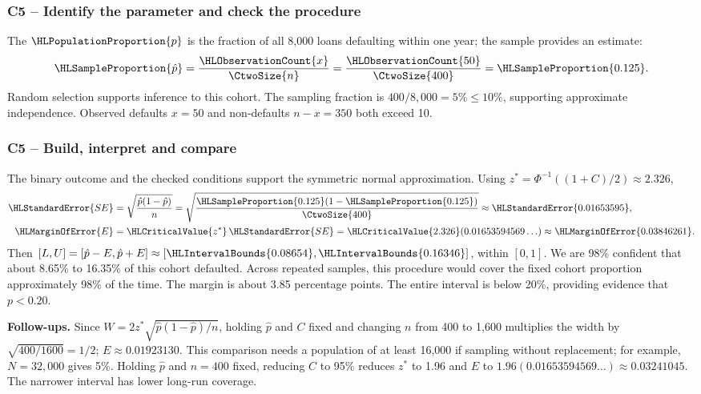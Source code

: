 \subsubsection*{C5 -- Identify the parameter and check the procedure}\label{sol:c5-1-a}
The  $\HLPopulationProportion{p}$ is the fraction of all 8,000 loans defaulting within one year; the sample provides an estimate:
\[
\HLSampleProportion{\hat p}=\frac{\HLObservationCount{x}}{\CtwoSize{n}}=
\frac{\HLObservationCount{50}}{\CtwoSize{400}}=\HLSampleProportion{0.125}.
\]
Random selection supports inference to this cohort. The sampling fraction is $400/8{,}000=5\%\le10\%$, supporting approximate independence. Observed defaults $x=50$ and non-defaults $n-x=350$ both exceed 10.

\subsubsection*{C5 -- Build, interpret and compare}\label{sol:c5-1-b}
The binary outcome and the checked conditions support the symmetric normal approximation. Using $z^*=\Phi^{-1}((1+C)/2)\approx2.326$,
\begin{align*}
\HLStandardError{SE}&=\sqrt{\frac{\hat p(1-\hat p)}{n}}
=\sqrt{\frac{\HLSampleProportion{0.125}(1-\HLSampleProportion{0.125})}{\CtwoSize{400}}}
\approx\HLStandardError{0.01653595},\\
\HLMarginOfError{E}&=\HLCriticalValue{z^*}\,\HLStandardError{SE}
=\HLCriticalValue{2.326}(0.01653594569\ldots)\approx\HLMarginOfError{0.03846261}.
\end{align*}
Then $[L,U]=[\hat p-E,\hat p+E]\approx[\HLIntervalBounds{0.08654},\HLIntervalBounds{0.16346}]$, within $[0,1]$. We are 98\% confident that about 8.65\% to 16.35\% of this cohort defaulted. Across repeated samples, this procedure would cover the fixed cohort proportion approximately 98\% of the time. The margin is about 3.85 percentage points. The entire interval is below 20\%, providing evidence that $p<0.20$.

\textbf{Follow-ups.} Since $W=2z^*\sqrt{\hat p(1-\hat p)/n}$, holding $\hat p$ and $C$ fixed and changing $n$ from 400 to 1,600 multiplies the width by $\sqrt{400/1600}=1/2$; $E\approx0.01923130$. This comparison needs a population of at least 16,000 if sampling without replacement; for example, $N=32,000$ gives 5\%. Holding $\hat p$ and $n=400$ fixed, reducing $C$ to 95\% reduces $z^*$ to 1.96 and $E$ to $1.96(0.01653594569\ldots)\approx0.03241045$. The narrower interval has lower long-run coverage.
\clearpage

